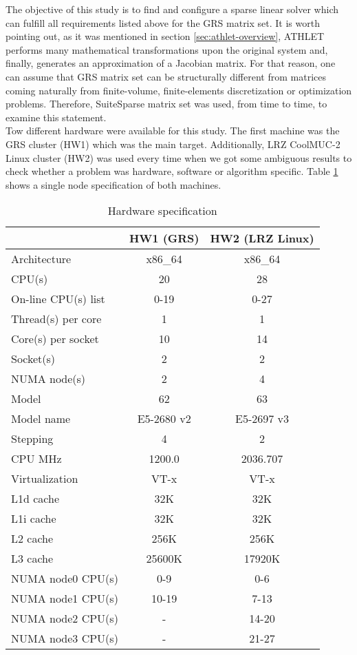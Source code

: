 The objective of this study is to find and configure a sparse linear solver which can fulfill all requirements listed above for the GRS matrix set. It is worth pointing out, as it was mentioned in section \ref{sec:athlet-overview}, ATHLET performs many mathematical transformations upon the original system and, finally, generates an approximation of a Jacobian matrix. For that reason, one can assume that GRS matrix set can be structurally different from matrices coming naturally from finite-volume, finite-elements discretization or optimization problems. Therefore, SuiteSparse matrix set was used, from time to time, to examine this statement.\\


Tow different hardware were available for this study. The first machine was the GRS cluster (HW1) which was the main target. Additionally, LRZ CoolMUC-2 Linux cluster (HW2) was used every time when we got some ambiguous results to check whether a problem was hardware, software or algorithm specific. Table \ref{table:hardware-spec} shows a single node specification of both machines.\\


\begin{table}[ht]
\centering
\small
\begin{tabular}{|l|c|c|}
\hline
                    & HW1 (GRS) & HW2 (LRZ Linux) \\ \hline
Architecture        & x86\_64 & x86\_64 \\ \hline
CPU(s)              & 20 &  28 \\ \hline
On-line CPU(s) list & 0-19 &  0-27 \\ \hline
Thread(s) per core  & 1 &  1 \\  \hline
Core(s) per socket  & 10 & 14 \\ \hline
Socket(s)           & 2 &  2 \\ \hline
NUMA node(s)        & 2 &  4 \\ \hline
Model               & 62 &  63 \\ \hline
Model name          & E5-2680 v2 & 
E5-2697 v3 \\ \hline
Stepping            & 4 &  2 \\ \hline
CPU MHz             & 1200.0 &  2036.707 \\ \hline
Virtualization      & VT-x &  VT-x \\ \hline
L1d cache           & 32K &  32K \\ \hline
L1i cache           & 32K &  32K \\ \hline
L2 cache            & 256K &  256K \\ \hline
L3 cache            & 25600K &  17920K \\ \hline
NUMA node0 CPU(s)   & 0-9 &  0-6 \\ \hline
NUMA node1 CPU(s)   & 10-19 &  7-13 \\ \hline
NUMA node2 CPU(s)   & - &  14-20 \\ \hline
NUMA node3 CPU(s)   & - &  21-27 \\ \hline
\end{tabular}
\caption{Hardware specification}
\label{table:hardware-spec}
\end{table}


